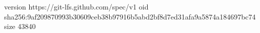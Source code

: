 version https://git-lfs.github.com/spec/v1
oid sha256:9af209870993b30609ceb38b97916b5abd2bf8d7ed31afa9a5874a184697bc74
size 43840
